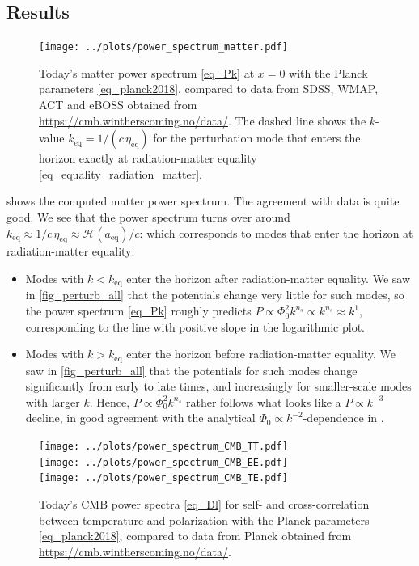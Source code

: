 \documentclass[10pt,a4paper]{article}
\begin{document}
\subsection{Results}

\begin{figure}
\centering
\texttt{[image: ../plots/power\_spectrum\_matter.pdf]}
\caption{
	Today's matter power spectrum \eqref{eq_Pk} at $x=0$ with the Planck parameters \eqref{eq_planck2018},
	compared to data from SDSS, WMAP, ACT and eBOSS obtained from \href{https://cmb.wintherscoming.no/data/}{https://cmb.wintherscoming.no/data/}.
	The dashed line shows the $k$-value $k_\text{eq} = 1/(c \, \eta_\text{eq})$ for the perturbation mode that enters the horizon exactly at radiation-matter equality \eqref{eq_equality_radiation_matter}.
}
\label{fig_power_spectrum_matter}
\end{figure}

 shows the computed matter power spectrum.
The agreement with data is quite good.
We see that the power spectrum turns over around
$k_\text{eq} \approx 1/c\,\eta_\text{eq} \approx \mathcal{H}(a_\text{eq})/c$:
which corresponds to modes that enter the horizon at radiation-matter equality:
\begin{itemize}
\item
Modes with $k<k_\text{eq}$ enter the horizon after radiation-matter equality.
We saw in \cref{fig_perturb_all} that the potentials change very little for such modes,
so the power spectrum \eqref{eq_Pk} roughly predicts $P \propto \Phi_0^2 k^{n_s} \propto k^{n_s} \approx k^1$,
corresponding to the line with positive slope in the logarithmic plot.

\item
Modes with $k>k_\text{eq}$ enter the horizon before radiation-matter equality.
We saw in \cref{fig_perturb_all} that the potentials for such modes change significantly from early to late times,
and increasingly for smaller-scale modes with larger $k$.
Hence, $P \propto \Phi_0^2 k^{n_s}$ rather follows what looks like a $P \propto k^{-3}$ decline,
in good agreement with the analytical $\Phi_0 \propto k^{-2}$-dependence in \cite[equation (8.71)]{dodelsonModernCosmology2021}.
\end{itemize}

\begin{figure}
\centering
\texttt{[image: ../plots/power\_spectrum\_CMB\_TT.pdf]} \\
\texttt{[image: ../plots/power\_spectrum\_CMB\_EE.pdf]} \\
\texttt{[image: ../plots/power\_spectrum\_CMB\_TE.pdf]}
\caption{
	Today's CMB power spectra \eqref{eq_Dl} for self- and cross-correlation between temperature and polarization with the Planck parameters \eqref{eq_planck2018},
	compared to data from Planck obtained from \href{https://cmb.wintherscoming.no/data/}{https://cmb.wintherscoming.no/data/}.
}
\label{fig_power_spectrum_cmb}
\end{figure}
\end{document}
